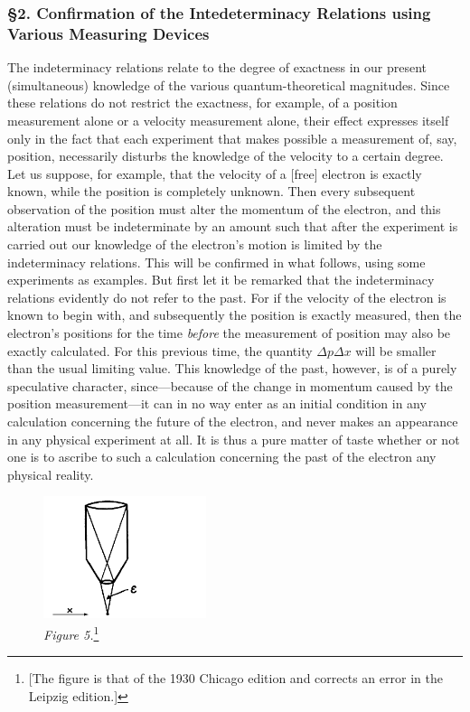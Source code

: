 \subsubsection*{§2. Confirmation of the Intedeterminacy Relations using Various
Measuring Devices}

The indeterminacy relations relate to the degree of exactness in our
present (simultaneous) knowledge of the various quantum-theoretical
magnitudes. Since these relations do not restrict the exactness, for
example, of a position measurement alone or a velocity measurement
alone, their effect expresses itself only in the fact that each
experiment that makes possible a measurement of, say, position,
necessarily disturbs the knowledge of the velocity to a certain degree.
Let us suppose, for example, that the velocity of a {[}free{]} electron
is exactly known, while the position is completely unknown. Then every
subsequent observation of the position must alter the momentum of the
electron, and this alteration must be indeterminate by an amount such
that after the experiment is carried out our knowledge of the electron's
motion is limited by the indeterminacy relations. This will be confirmed
in what follows, using some experiments as examples. But first let it be
remarked that the indeterminacy relations evidently do not refer to the
past. For if the velocity of the electron is known to begin with, and
subsequently the position is exactly measured, then the electron's
positions for the time \emph{before} the measurement of position may
also be exactly calculated. For this previous time, the quantity
$\Delta p\Delta x$ will be smaller than the usual limiting value. This
knowledge of the past, however, is of a purely speculative character,
since---because of the change in momentum caused by the position
measurement---it can in no way enter as an initial condition in any
calculation concerning the future of the electron, and never makes an
appearance in any physical experiment at all. It is thus a pure matter
of taste whether or not one is to ascribe to such a calculation
concerning the past of the electron any physical reality.

\begin{figure}[h] %
  \begin{center}
    \includegraphics[width=1.875in,height=1.40625in]{images/10_heisenberg/image015.png}
  \end{center}
  \caption*{\emph{Figure 5.}\footnote{{[}The figure is that of the 1930 Chicago edition and
  corrects an error in the Leipzig edition.{]}}}
\end{figure}

